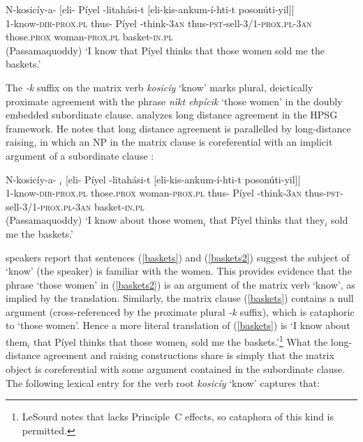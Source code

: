 \documentclass[output=paper
 	        ,biblatex
                ,babelshorthands
                ,newtxmath
                ,draftmode
                ,colorlinks, citecolor=brown
]{langscibook}
\begin{document}
\begin{exe}
\ex\label{baskets}
\gll N-kosicíy-a-  [eli- Píyel -litah\'{a}si-t           {[eli-kis-ankum-í-hti-t}     	{poson\'{u}ti-yil]]} \\
     1-know-\textsc{dir-prox.pl} \spacebr{}thus- Píyel -think-\textsc{3an} { \spacebr{}thus-\textsc{pst}-sell-\textsc{3/1-prox.pl-3an}}         those.\textsc{prox}  woman-\textsc{prox.pl}     basket-\textsc{in.pl}\\\hfill(Passamaquoddy)
\glt `I know that Píyel thinks that those women sold me the baskets.’
\end{exe}

\noindent
The \textit{-k} suffix on the matrix verb \textit{kosicíy} `know' marks plural, deictically proximate agreement with the phrase \textit{n\`{i}kt ehpícik} `those women'  in the doubly embedded subordinate clause.  \citet{LeSourd:2018} analyzes  long distance agreement in the HPSG framework.   He notes that   long distance agreement is parallelled by long-distance raising, in which an NP in the matrix clause is coreferential with an implicit argument of a subordinate clause \citep[example\,(4)]{LeSourd:2018}:  

\begin{exe}
\ex\label{baskets2}
\gll N-kosicíy-a-   $_i$ [eli- Píyel -litah\'{a}si-t  [eli-kis-ankum-í-hti-t   	{poson\'{u}ti-yil]]} \\
     1-know-\textsc{dir-prox.pl} those.\textsc{prox}  woman-\textsc{prox.pl} \spacebr{}thus- Píyel -think-\textsc{3an} \spacebr{}thus-\textsc{pst}-sell-\textsc{3/1-prox.pl-3an}         {}    basket-\textsc{in.pl}\\\hfill(Passamaquoddy)
\glt `I know about those women$_i$ that Píyel thinks that they$_i$ sold me the baskets.’
\end{exe}

\noindent
{} speakers report that sentences (\ref{baskets}) and (\ref{baskets2}) suggest the subject of `know' (the speaker) is familiar with the women.  This provides evidence that the phrase `those women' in (\ref{baskets2}) is an argument of the matrix verb `know', as implied by the translation.  
Similarly, the matrix clause (\ref{baskets}) contains a null argument (cross-referenced by the proximate plural \textit{-k}  suffix), which is  cataphoric to `those women'.  Hence a more literal translation of (\ref{baskets}) is `I know about them$_i$ that Píyel thinks that those women$_i$ sold me the baskets.'\footnote{LeSourd notes that  lacks Principle~C effects, so cataphora of this kind is permitted.}  What the long-distance agreement and raising constructions share is simply that the matrix object is coreferential with some argument contained in the subordinate clause.  The following lexical entry for the verb root \textit{kosicíy} `know' captures that:
\end{document}

